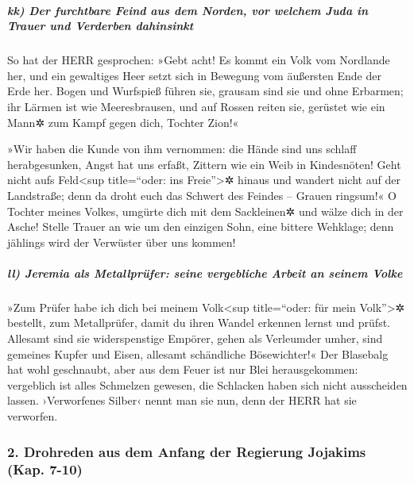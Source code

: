\hypertarget{kk-der-furchtbare-feind-aus-dem-norden-vor-welchem-juda-in-trauer-und-verderben-dahinsinkt}{%
\subparagraph{kk) Der furchtbare Feind aus dem Norden, vor welchem Juda
in Trauer und Verderben
dahinsinkt}\label{kk-der-furchtbare-feind-aus-dem-norden-vor-welchem-juda-in-trauer-und-verderben-dahinsinkt}}

So hat der HERR gesprochen: »Gebt acht! Es kommt ein Volk
vom Nordlande her, und ein gewaltiges Heer setzt sich in Bewegung vom
äußersten Ende der Erde her. Bogen und Wurfspieß führen
sie, grausam sind sie und ohne Erbarmen; ihr Lärmen ist wie
Meeresbrausen, und auf Rossen reiten sie, gerüstet wie ein Mann✲ zum
Kampf gegen dich, Tochter Zion!«

»Wir haben die Kunde von ihm vernommen: die Hände sind
uns schlaff herabgesunken, Angst hat uns erfaßt, Zittern wie ein Weib in
Kindesnöten! Geht nicht aufs Feld\textless sup
title=``oder: ins Freie''\textgreater✲ hinaus und wandert nicht auf der
Landstraße; denn da droht euch das Schwert des Feindes -- Grauen
ringsum!« O Tochter meines Volkes, umgürte dich mit dem
Sackleinen✲ und wälze dich in der Asche! Stelle Trauer an wie um den
einzigen Sohn, eine bittere Wehklage; denn jählings wird der Verwüster
über uns kommen!

\hypertarget{ll-jeremia-als-metallpruxfcfer-seine-vergebliche-arbeit-an-seinem-volke}{%
\subparagraph{ll) Jeremia als Metallprüfer: seine vergebliche Arbeit an
seinem
Volke}\label{ll-jeremia-als-metallpruxfcfer-seine-vergebliche-arbeit-an-seinem-volke}}

»Zum Prüfer habe ich dich bei meinem Volk\textless sup
title=``oder: für mein Volk''\textgreater✲ bestellt, zum Metallprüfer,
damit du ihren Wandel erkennen lernst und prüfst.
Allesamt sind sie widerspenstige Empörer, gehen als
Verleumder umher, sind gemeines Kupfer und Eisen, allesamt schändliche
Bösewichter!« Der Blasebalg hat wohl geschnaubt, aber aus
dem Feuer ist nur Blei herausgekommen: vergeblich ist alles Schmelzen
gewesen, die Schlacken haben sich nicht ausscheiden lassen.
›Verworfenes Silber‹ nennt man sie nun, denn der HERR hat
sie verworfen.

\hypertarget{drohreden-aus-dem-anfang-der-regierung-jojakims-kap.-7-10}{%
\subsubsection{2. Drohreden aus dem Anfang der Regierung Jojakims (Kap.
7-10)}\label{drohreden-aus-dem-anfang-der-regierung-jojakims-kap.-7-10}}

